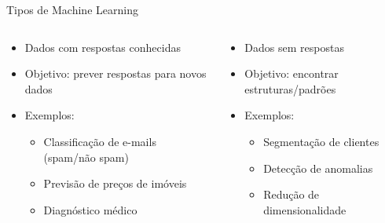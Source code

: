 \documentclass[xcolor=dvipsnames,t,aspectratio=169]{beamer} %
\newcommand{\highlight}[1]{{\color{nes_dark_orange} #1}}
\begin{document}
\begin{frame}[c]{Tipos de Machine Learning}
    \begin{columns}[c]
        \begin{column}{0.5\textwidth}
            \begin{display}
                \begin{itemize}
                    \item Dados com \highlight{respostas conhecidas}
                    \item Objetivo: prever respostas para novos dados
                    \item Exemplos:
                    \begin{itemize}
                        \item Classificação de e-mails (spam/não spam)
                        \item Previsão de preços de imóveis
                        \item Diagnóstico médico
                    \end{itemize}
                \end{itemize}
            \end{display}
        \end{column}
        \begin{column}{0.5\textwidth}
            \begin{display}
                \vspace{.4cm}
                \begin{itemize}
                    \item Dados \highlight{sem respostas}
                    \item Objetivo: encontrar estruturas/padrões
                    \item Exemplos:
                    \begin{itemize}
                        \item Segmentação de clientes
                        \item Detecção de anomalias
                        \item Redução de dimensionalidade
                    \end{itemize}
                \end{itemize}
                \vspace{.4cm}
            \end{display}
        \end{column}
    \end{columns}
\end{frame}
\end{document}
